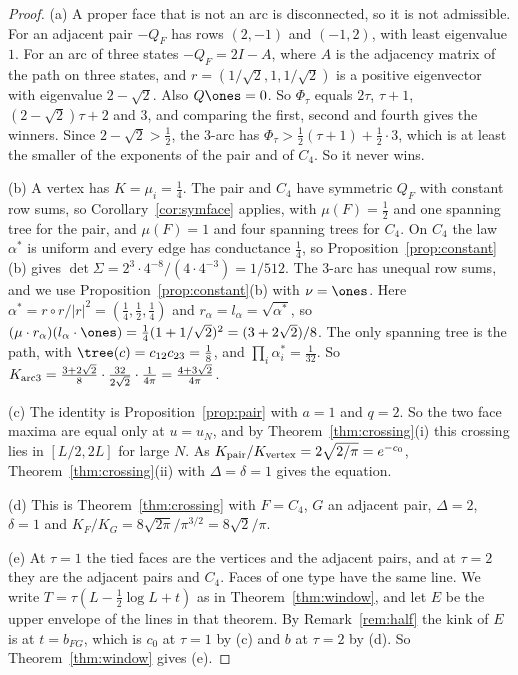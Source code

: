 \begin{proof}
(a) A proper face that is not an arc is disconnected, so it is not
admissible. For an adjacent pair $-Q_F$ has rows $(2,-1)$ and $(-1,2)$, with
least eigenvalue $1$. For an arc of three states $-Q_F=2I-A$, where $A$ is the
adjacency matrix of the path on three states, and $r=(1/\sqrt2,1,1/\sqrt2)$ is a
positive eigenvector with eigenvalue $2-\sqrt2$. Also $Q\ones=0$. So
$\Phi_\tau$ equals $2\tau$, $\tau+1$, $(2-\sqrt2)\tau+2$ and $3$, and comparing
the first, second and fourth gives the winners. Since $2-\sqrt2>\frac12$, the
3-arc has $\Phi_\tau>\frac12(\tau+1)+\frac12\cdot3$, which is at least the
smaller of the exponents of the pair and of $C_4$. So it never wins.

(b) A vertex has $K=\mu_i=\frac14$. The pair and $C_4$ have symmetric $Q_F$
with constant row sums, so Corollary~\ref{cor:symface} applies, with
$\mu(F)=\frac12$ and one spanning tree for the pair, and $\mu(F)=1$ and four
spanning trees for $C_4$. On $C_4$ the law $\alpha^*$ is uniform and every edge
has conductance $\frac14$, so Proposition~\ref{prop:constant}(b) gives
$\det\Sigma=2^3\cdot4^{-8}/(4\cdot4^{-3})=1/512$. The 3-arc has unequal row
sums, and we use Proposition~\ref{prop:constant}(b) with $\nu=\ones$. Here
$\alpha^*=r\circ r/\lvert r\rvert^2=(\frac14,\frac12,\frac14)$ and
$r_\alpha=l_\alpha=\sqrt{\alpha^*}$, so
$(\mu\cdot r_\alpha)(l_\alpha\cdot\ones)=\frac14(1+1/\sqrt2)^2=(3+2\sqrt2)/8$.
The only spanning tree is the path, with $\tree(c)=c_{12}c_{23}=\frac18$, and
$\prod_i\alpha^*_i=\frac1{32}$. So
$K_{\rm arc3}=\frac{3+2\sqrt2}8\cdot\frac{32}{2\sqrt2}\cdot\frac1{4\pi}
=\frac{4+3\sqrt2}{4\pi}$.

(c) The identity is Proposition~\ref{prop:pair} with $a=1$ and $q=2$. So the
two face maxima are equal only at $u=u_N$, and by
Theorem~\ref{thm:crossing}(i) this crossing lies in $[L/2,2L]$ for large $N$. As
$K_{\rm pair}/K_{\rm vertex}=2\sqrt{2/\pi}=e^{-c_0}$,
Theorem~\ref{thm:crossing}(ii) with $\Delta=\delta=1$ gives the equation.

(d) This is Theorem~\ref{thm:crossing} with $F=C_4$, $G$ an adjacent pair,
$\Delta=2$, $\delta=1$ and $K_F/K_G=8\sqrt{2\pi}/\pi^{3/2}=8\sqrt2/\pi$.

(e) At $\tau=1$ the tied faces are the vertices and the adjacent pairs, and
at $\tau=2$ they are the adjacent pairs and $C_4$. Faces of one type have the
same line. We write $T=\tau(L-\frac12\log L+t)$ as in
Theorem~\ref{thm:window}, and let $E$ be the upper envelope of the lines in
that theorem. By Remark~\ref{rem:half} the kink of $E$ is at $t=b_{FG}$, which is
$c_0$ at $\tau=1$ by (c) and $b$ at $\tau=2$ by (d). So
Theorem~\ref{thm:window} gives (e).
\end{proof}

